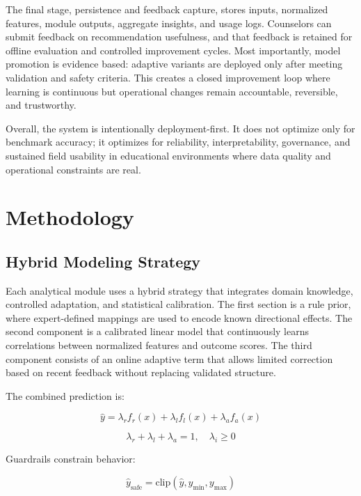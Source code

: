 \documentclass[conference]{IEEEtran}
\begin{document}
The final stage, persistence and feedback capture, stores inputs, normalized features, module outputs, aggregate insights, and usage logs. Counselors can submit feedback on recommendation usefulness, and that feedback is retained for offline evaluation and controlled improvement cycles. Most importantly, model promotion is evidence based: adaptive variants are deployed only after meeting validation and safety criteria. This creates a closed improvement loop where learning is continuous but operational changes remain accountable, reversible, and trustworthy.

Overall, the system is intentionally deployment-first. It does not optimize only for benchmark accuracy; it optimizes for reliability, interpretability, governance, and sustained field usability in educational environments where data quality and operational constraints are real.


\section{Methodology}

\subsection{Hybrid Modeling Strategy}

Each analytical module uses a hybrid strategy that integrates domain knowledge, controlled adaptation, and statistical calibration. The first section is a rule prior, where expert-defined mappings are used to encode known directional effects. The second component is a calibrated linear model that continuously learns correlations between normalized features and outcome scores.
The third component consists of an online adaptive term that allows limited correction based on recent feedback without replacing validated structure.

The combined prediction is:

\begin{equation}
\hat{y} = \lambda_r f_r(x) + \lambda_l f_l(x) + \lambda_a f_a(x)
\end{equation}

\begin{equation}
\lambda_r + \lambda_l + \lambda_a = 1, \quad \lambda_i \ge 0
\end{equation}

Guardrails constrain behavior:

\begin{equation}
\hat{y}_{\text{safe}} = \mathrm{clip}(\hat{y}, y_{\min}, y_{\max})
\end{equation}
\end{document}
